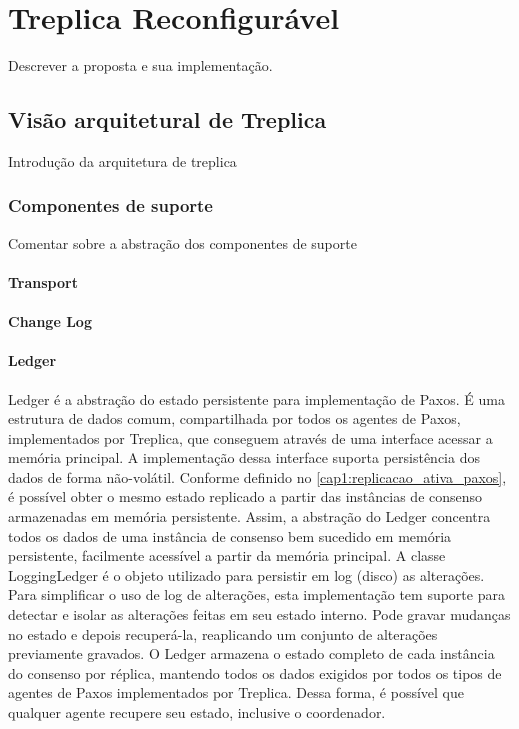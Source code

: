 \chapter{Treplica Reconfigurável}\label{cap2}

Descrever a proposta e sua implementação.

\section{Visão arquitetural de Treplica}

Introdução da arquitetura de treplica

\subsection{Componentes de suporte}

Comentar sobre a abstração dos componentes de suporte

\subsubsection{Transport}

\subsubsection{Change Log}

\subsubsection{Ledger}

Ledger é a abstração do estado persistente para implementação de Paxos. É uma estrutura
de dados comum, compartilhada por todos os agentes de Paxos, implementados por Treplica,
que conseguem através de uma interface acessar a memória principal. A implementação dessa
interface suporta persistência dos dados de forma não-volátil. Conforme definido no
\autoref{cap1:replicacao_ativa_paxos}, é possível obter o mesmo estado replicado a partir
das instâncias de consenso armazenadas em memória persistente. Assim, a abstração do
Ledger concentra todos os dados de uma instância de consenso bem sucedido em memória
persistente, facilmente acessível a partir da memória principal. A classe LoggingLedger é
o objeto utilizado para persistir em log (disco) as alterações. Para simplificar o uso de
log de alterações, esta implementação tem suporte para detectar e isolar as alterações
feitas em seu estado interno. Pode gravar mudanças no estado e depois recuperá-la,
reaplicando um conjunto de alterações previamente gravados. O Ledger armazena o estado
completo de cada instância do consenso por réplica, mantendo todos os dados exigidos por
todos os tipos de agentes de Paxos implementados por Treplica. Dessa forma, é possível que
qualquer agente recupere seu estado, inclusive o coordenador.

